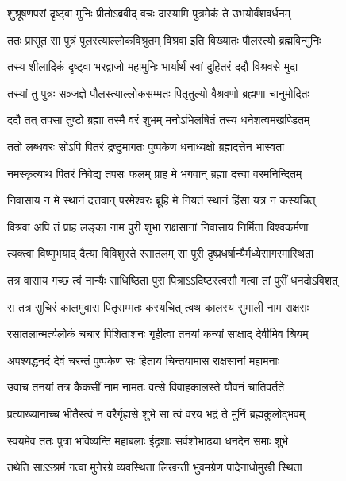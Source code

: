 \twolineshloka
{शुश्रूषणपरां दृष्ट्वा मुनिः प्रीतोऽब्रवीद् वचः}
{दास्यामि पुत्रमेकं ते उभयोर्वंशवर्धनम्} %

\twolineshloka
{ततः प्रासूत सा पुत्रं पुलस्त्याल्लोकविश्रुतम्}
{विश्रवा इति विख्यातः पौलस्त्यो ब्रह्मविन्मुनिः} %

\twolineshloka
{तस्य शीलादिकं दृष्ट्वा भरद्वाजो महामुनिः}
{भार्यार्थं स्वां दुहितरं ददौ विश्रवसे मुदा} %

\twolineshloka
{तस्यां तु पुत्रः सञ्जज्ञे पौलस्त्याल्लोकसम्मतः}
{पितृतुल्यो वैश्रवणो ब्रह्मणा चानुमोदितः} %

\twolineshloka
{ददौ तत् तपसा तुष्टो ब्रह्मा तस्मै वरं शुभम्}
{मनोऽभिलषितं तस्य धनेशत्वमखण्डितम्} %

\twolineshloka
{ततो लब्धवरः सोऽपि पितरं द्रष्टुमागतः}
{पुष्पकेण धनाध्यक्षो ब्रह्मदत्तेन भास्वता} %

\twolineshloka
{नमस्कृत्याथ पितरं निवेद्य तपसः फलम्}
{प्राह मे भगवान् ब्रह्मा दत्त्वा वरमनिन्दितम्} %

\twolineshloka
{निवासाय न मे स्थानं दत्तवान् परमेश्वरः}
{ब्रूहि मे नियतं स्थानं हिंसा यत्र न कस्यचित्} %

\twolineshloka
{विश्रवा अपि तं प्राह लङ्का नाम पुरी शुभा}
{राक्षसानां निवासाय निर्मिता विश्वकर्मणा} %

\twolineshloka
{त्यक्त्वा विष्णुभयाद् दैत्या विविशुस्ते रसातलम्}
{सा पुरी दुष्प्रधर्षान्यैर्मध्येसागरमास्थिता} %

\twolineshloka
{तत्र वासाय गच्छ त्वं नान्यैः साधिष्ठिता पुरा}
{पित्राऽऽदिष्टस्त्वसौ गत्वा तां पुरीं धनदोऽविशत्} %

\twolineshloka
{स तत्र सुचिरं कालमुवास पितृसम्मतः}
{कस्यचित् त्वथ कालस्य सुमाली नाम राक्षसः} %

\twolineshloka
{रसातलान्मर्त्यलोकं चचार पिशिताशनः}
{गृहीत्वा तनयां कन्यां साक्षाद् देवीमिव श्रियम्} %

\twolineshloka
{अपश्यद्धनदं देवं चरन्तं पुष्पकेण सः}
{हिताय चिन्तयामास राक्षसानां महामनाः} %

\twolineshloka
{उवाच तनयां तत्र कैकसीं नाम नामतः}
{वत्से विवाहकालस्ते यौवनं चातिवर्तते} %

\twolineshloka
{प्रत्याख्यानाच्च भीतैस्त्वं न वरैर्गृह्यसे शुभे}
{सा त्वं वरय भद्रं ते मुनिं ब्रह्मकुलोद्भवम्} %

\twolineshloka
{स्वयमेव ततः पुत्रा भविष्यन्ति महाबलाः}
{ईदृशाः सर्वशोभाढ्या धनदेन समाः शुभे} %

\twolineshloka
{तथेति साऽऽश्रमं गत्वा मुनेरग्रे व्यवस्थिता}
{लिखन्ती भुवमग्रेण पादेनाधोमुखी स्थिता} %

